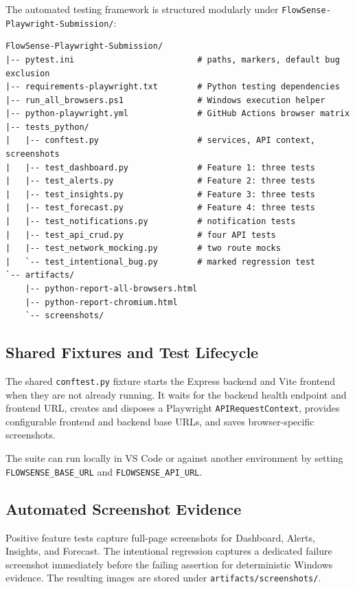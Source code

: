 \documentclass[11pt,a4paper]{article}
\begin{document}
The automated testing framework is structured modularly under \texttt{FlowSense-Playwright-Submission/}:

\begin{lstlisting}
FlowSense-Playwright-Submission/
|-- pytest.ini                         # paths, markers, default bug exclusion
|-- requirements-playwright.txt        # Python testing dependencies
|-- run_all_browsers.ps1               # Windows execution helper
|-- python-playwright.yml              # GitHub Actions browser matrix
|-- tests_python/
|   |-- conftest.py                    # services, API context, screenshots
|   |-- test_dashboard.py              # Feature 1: three tests
|   |-- test_alerts.py                 # Feature 2: three tests
|   |-- test_insights.py               # Feature 3: three tests
|   |-- test_forecast.py               # Feature 4: three tests
|   |-- test_notifications.py          # notification tests
|   |-- test_api_crud.py               # four API tests
|   |-- test_network_mocking.py        # two route mocks
|   `-- test_intentional_bug.py        # marked regression test
`-- artifacts/
    |-- python-report-all-browsers.html
    |-- python-report-chromium.html
    `-- screenshots/
\end{lstlisting}

\subsection{Shared Fixtures and Test Lifecycle}

The shared \texttt{conftest.py} fixture starts the Express backend and Vite frontend when they are not already running. It waits for the backend health endpoint and frontend URL, creates and disposes a Playwright \texttt{APIRequestContext}, provides configurable frontend and backend base URLs, and saves browser-specific screenshots.

The suite can run locally in VS Code or against another environment by setting \texttt{FLOWSENSE\_BASE\_URL} and \texttt{FLOWSENSE\_API\_URL}.

\subsection{Automated Screenshot Evidence}

Positive feature tests capture full-page screenshots for Dashboard, Alerts, Insights, and Forecast. The intentional regression captures a dedicated failure screenshot immediately before the failing assertion for deterministic Windows evidence. The resulting images are stored under \texttt{artifacts/screenshots/}.
\end{document}
